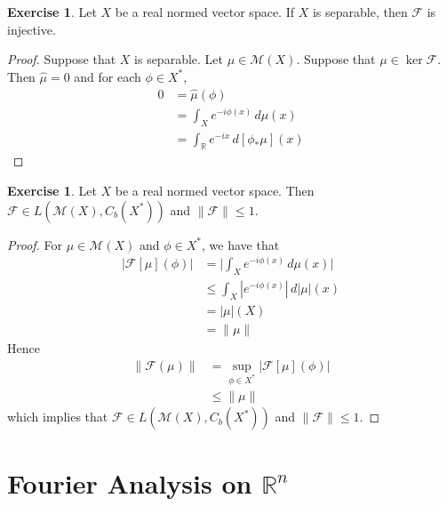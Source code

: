 \documentclass{book}
\theoremstyle{definition}
\newtheorem{ex}[definition]{Exercise}
\newcommand{\R}{\mathbb{R}}
\newcommand{\MF}{\mathcal{F}}
\newcommand{\MM}{\mathcal{M}}
\DeclareMathOperator*{\0}{\mbf{0}}
\DeclareMathOperator*{\1}{\mbf{1}}
\newcommand{\dmu}{\, d \mu}
\begin{document}
	\begin{ex}
		Let $X$ be a real normed vector space. If $X$ is separable, then $\MF$ is injective.  
	\end{ex}
	
	\begin{proof}
		Suppose that $X$ is separable. Let $\mu \in \MM(X)$. Suppose that $\mu \in \ker \MF$. Then $\hat{\mu} =0$ and for each $\phi \in X^*$, 
		\begin{align*}
			0 
			& = \hat{\mu}(\phi) \\
			& = \int_X e^{-i \phi(x)} \dmu(x) \\
			& = \int_{\R} e^{-ix} \, d[\phi_*\mu](x)
		\end{align*}
	\end{proof}
	
	\begin{ex}
		Let $X$ be a real normed vector space. Then $\MF \in L(\MM(X), C_b(X^*))$ and $\|\MF\| \leq 1$.
	\end{ex}
	
	\begin{proof}
		For $\mu \in \MM(X)$ and $\phi \in X^*$, we have that 
		\begin{align*}
			|\MF[\mu](\phi)|
			& =  \bigg| \int_X e^{-i \phi(x)} \dmu(x) \bigg| \\
			& \leq \int_X |e^{-i \phi(x)}| \, d|\mu|(x) \\
			& = |\mu|(X) \\
			& = \|\mu\|
		\end{align*}
		Hence 
		\begin{align*}
			\|\MF(\mu)\| 
			& = \sup_{\phi \in X^*} |\MF[\mu](\phi)| \\
			& \leq \|\mu\|
		\end{align*}
		which implies that $\MF \in L(\MM(X), C_b(X^*))$ and $\|\MF\| \leq 1$.
	\end{proof}
	
	
	
	
	
	
	
	
	
	
	
	
	
	
	
	
	
	
	
	
	
	\newpage
	\chapter{Fourier Analysis on $\R^n$}	
\end{document}
